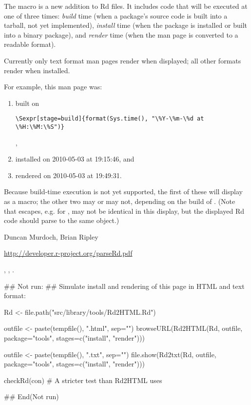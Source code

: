 %
\begin{Note}\relax
The  macro is a new addition to Rd files.  It includes
\R{} code that will be executed at one of three times: \emph{build} time
(when a package's source code is built into a tarball, not yet
implemented), \emph{install} time (when the package is installed or
built into a binary package), and \emph{render} time (when the man
page is converted to a readable format).

Currently only text format man pages render when displayed; all other
formats render when installed.

For example, this man page was:
\begin{enumerate}

\item built on
\begin{verbatim}
\Sexpr[stage=build]{format(Sys.time(), "\%Y-\%m-\%d at \%H:\%M:\%S")}
\end{verbatim}
,
\item installed on
2010-05-03 at 19:15:46, and
\item rendered on
2010-05-03 at 19:49:31.

\end{enumerate}

Because build-time execution is not yet supported, the first of these
will display as a macro; the other two may or may not, depending on the
build of \R{}.  (Note that escapes, e.g. for \samp{\%}, may not be
identical in this display, but the displayed Rd code should parse to the
same object.)
\end{Note}
%
\begin{Author}\relax
Duncan Murdoch, Brian Ripley
\end{Author}
%
\begin{References}\relax
 \url{http://developer.r-project.org/parseRd.pdf} 
\end{References}
%
\begin{SeeAlso}\relax
{}, ,
.
\end{SeeAlso}
%
\begin{Examples}
\begin{ExampleCode}


## Not run: 
## Simulate install and rendering of this page in HTML and text format:

Rd <- file.path("src/library/tools/Rd2HTML.Rd")

outfile <- paste(tempfile(), ".html", sep="")
browseURL(Rd2HTML(Rd, outfile, package="tools", stages=c("install", "render")))

outfile <- paste(tempfile(), ".txt", sep="")
file.show(Rd2txt(Rd, outfile, package="tools", stages=c("install", "render")))

checkRd(con) # A stricter test than Rd2HTML uses

## End(Not run)
\end{ExampleCode}
\end{Examples}
